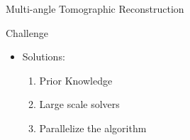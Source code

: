 \documentclass[compress,red,12pt]{beamer}
\begin{document}

\begin{frame}{Multi-angle Tomographic Reconstruction}
  \begin{center}
    \centerline{\def\svgwidth{\linewidth}\small{}}
  \end{center}
\end{frame}


\begin{frame}{Challenge}
  \begin{center}
    \centering
    {
      \begin{itemize}
      \item Solutions:
        \begin{enumerate}
        \item Prior Knowledge
        \item Large scale solvers
        \item Parallelize the algorithm
        \end{enumerate}
      \end{itemize}
    }
  \end{center}
\end{frame}

\end{document}
